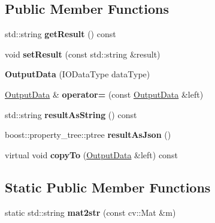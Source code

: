 \subsection*{Public Member Functions}
\begin{DoxyCompactItemize}
\item 
\mbox{\label{classfilter_1_1data_1_1_output_data_a4847c29c3f9221d36efd3ed5fcb99d9f}} 
std\+::string {\bfseries get\+Result} () const
\item 
\mbox{\label{classfilter_1_1data_1_1_output_data_ab596d045cc75fa1e8e6e36e8f51fb8ef}} 
void {\bfseries set\+Result} (const std\+::string \&result)
\item 
\mbox{\label{classfilter_1_1data_1_1_output_data_a233bb01f44ccaf36c3bbc7cbab6bc15e}} 
{\bfseries Output\+Data} (I\+O\+Data\+Type data\+Type)
\item 
\mbox{\label{classfilter_1_1data_1_1_output_data_a1096b065f25d2675239dcfa64c8c115d}} 
\hyperlink{classfilter_1_1data_1_1_output_data}{Output\+Data} \& {\bfseries operator=} (const \hyperlink{classfilter_1_1data_1_1_output_data}{Output\+Data} \&left)
\item 
\mbox{\label{classfilter_1_1data_1_1_output_data_a657e966248ef016413afd6f6c2d3226d}} 
std\+::string {\bfseries result\+As\+String} () const
\item 
\mbox{\label{classfilter_1_1data_1_1_output_data_aacd9acfaa2131e2422f0ff0d31fec1dd}} 
boost\+::property\+\_\+tree\+::ptree {\bfseries result\+As\+Json} ()
\item 
\mbox{\label{classfilter_1_1data_1_1_output_data_ac92922cc8904ae2c52675d933419715e}} 
virtual void {\bfseries copy\+To} (\hyperlink{classfilter_1_1data_1_1_output_data}{Output\+Data} \&left) const
\end{DoxyCompactItemize}
\subsection*{Static Public Member Functions}
\begin{DoxyCompactItemize}
\item 
\mbox{\label{classfilter_1_1data_1_1_output_data_ab9e65663a9d472866e2b6bb9fa96fa11}} 
static std\+::string {\bfseries mat2str} (const cv\+::\+Mat \&m)
\end{DoxyCompactItemize}
